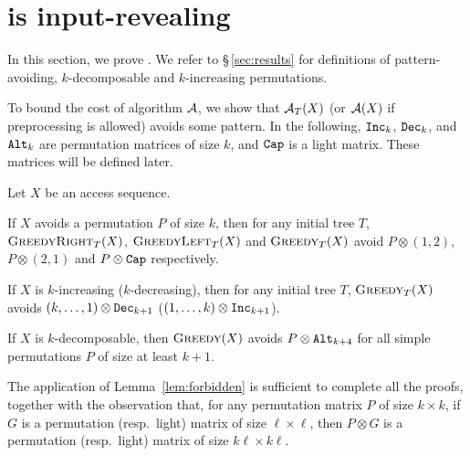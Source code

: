 
\section{\greedy is input-revealing}
\label{sec:input-rev}
In this section, we prove .
We refer to \S\,\ref{sec:results} for definitions of pattern-avoiding, $k$-decomposable and $k$-increasing permutations.

To bound the cost of algorithm ${\mathcal{A}}$, we show that ${\mathcal{A}}_T(X)$ (or ${\mathcal{A}}(X)$ if preprocessing is allowed) avoids some pattern.  
In the following, $\texttt{Inc}_k$, $\texttt{Dec}_k$, and $\texttt{Alt}_k$ are permutation matrices of size $k$, and $\texttt{Cap}$ is a light matrix. These matrices will be defined later.
\begin{lemma}
	\label{lem:touch avoid}Let $X$ be an access sequence.
\begin{compactenum}[(i)]
		\item If $X$ avoids a permutation $P$ of size $k$, then for any initial
		tree $T$, $\textsc{GreedyRight}_{T}(X)$, $\textsc{GreedyLeft}_{T}(X)$ and $\textsc{Greedy}_{T}(X)$
		avoid $P\otimes(1,2)$, $P\otimes(2,1)$ and $P\otimes\texttt{Cap}$
		respectively.
		\item If $X$ is $k$-increasing ($k$-decreasing), then for any initial
		tree $T$, $\textsc{Greedy}_{T}(X)$ avoids $(k,\dots,1)\otimes\texttt{Dec}_{k+1}$
		($(1,\dots,k)\otimes\texttt{Inc}_{k+1}$).
		\item If $X$ is $k$-decomposable, then $\textsc{Greedy}(X)$ avoids $P\otimes\texttt{Alt}_{k+4}$
		for all simple permutations $P$ of size at least $k+1$.
	\end{compactenum}
\end{lemma}

The application of Lemma~\ref{lem:forbidden} is sufficient to complete all the proofs, together with the observation that, for any permutation matrix $P$ of size $k \times k$, if $G$ is a permutation (resp.\ light) matrix of size $\ell \times \ell$, then $P \otimes G$ is a permutation (resp.\ light) matrix of size $k \ell \times k \ell$.

